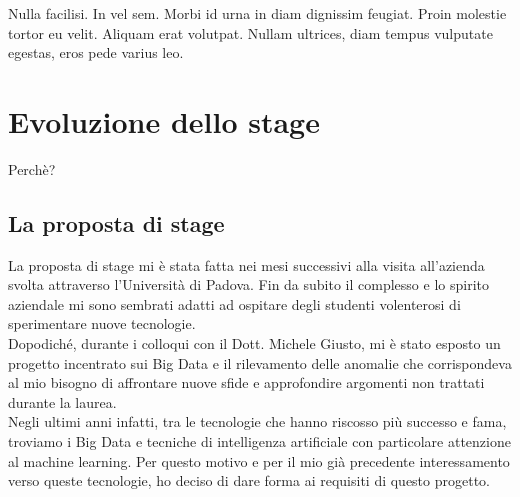 \begin{savequote}[75mm]
Nulla facilisi. In vel sem. Morbi id urna in diam dignissim feugiat. Proin molestie tortor eu velit. Aliquam erat volutpat. Nullam ultrices, diam tempus vulputate egestas, eros pede varius leo.
\end{savequote}

\chapter{Evoluzione dello stage}
Perchè?
\section{La proposta di stage}
La proposta di stage mi è stata fatta nei mesi successivi alla visita all'azienda svolta attraverso l'Università di Padova. Fin da subito il complesso e lo spirito aziendale mi sono sembrati adatti ad ospitare degli studenti volenterosi di sperimentare nuove tecnologie.
\\
Dopodiché, durante i colloqui con il Dott. Michele Giusto, mi è stato esposto un progetto incentrato sui Big Data e il rilevamento delle anomalie che corrispondeva al mio bisogno di affrontare nuove sfide e approfondire argomenti non trattati durante la laurea.
\\
Negli ultimi anni infatti, tra le tecnologie che hanno riscosso più successo e fama, troviamo i Big Data e tecniche di intelligenza artificiale con particolare attenzione al machine learning.
Per questo motivo e per il mio già precedente interessamento verso queste tecnologie, ho deciso di dare forma ai requisiti di questo progetto. 

